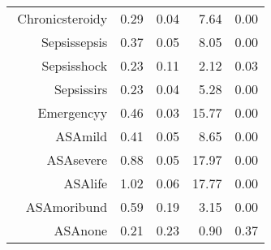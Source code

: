 \begin{tabular}{rrrrr}
$$  Chronic\-steroid\-y & 0.29 & 0.04 & 7.64 & 0.00 \\ 
  Sepsis\-sepsis & 0.37 & 0.05 & 8.05 & 0.00 \\ 
  Sepsis\-shock & 0.23 & 0.11 & 2.12 & 0.03 \\ 
  Sepsis\-sirs & 0.23 & 0.04 & 5.28 & 0.00 \\ 
  Emergency\-y & 0.46 & 0.03 & 15.77 & 0.00 \\ 
  ASA\-mild & 0.41 & 0.05 & 8.65 & 0.00 \\ 
  ASA\-severe & 0.88 & 0.05 & 17.97 & 0.00 \\ 
  ASA\-life & 1.02 & 0.06 & 17.77 & 0.00 \\ 
  ASA\-moribund & 0.59 & 0.19 & 3.15 & 0.00 \\ 
  ASA\-none & 0.21 & 0.23 & 0.90 & 0.37 \\ 
   \hline
\end{tabular}

